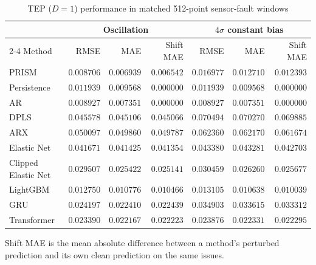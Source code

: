 \begin{table}[!t]
\centering
\caption{TEP ($D=1$) performance in matched 512-point sensor-fault windows}
\label{tab:fault-tep-d1}
\small
\begin{tabular}{lrrrrrr}
\hline
 & \multicolumn{3}{c}{Oscillation} & \multicolumn{3}{c}{$4\sigma$ constant bias} \\
\cline{2-4}\cline{5-7}
Method & RMSE & MAE & Shift MAE & RMSE & MAE & Shift MAE \\
\hline
PRISM & \(0.008706\) & \(0.006939\) & \(0.006542\) & \(0.016977\) & \(0.012710\) & \(0.012393\) \\
Persistence & \(0.011939\) & \(0.009568\) & \(0.000000\) & \(0.011939\) & \(0.009568\) & \(0.000000\) \\
AR & \(0.008927\) & \(0.007351\) & \(0.000000\) & \(0.008927\) & \(0.007351\) & \(0.000000\) \\
DPLS & \(0.045578\) & \(0.045106\) & \(0.045066\) & \(0.070494\) & \(0.070270\) & \(0.069885\) \\
ARX & \(0.050097\) & \(0.049860\) & \(0.049787\) & \(0.062360\) & \(0.062170\) & \(0.061674\) \\
Elastic Net & \(0.041671\) & \(0.041425\) & \(0.041354\) & \(0.043380\) & \(0.043281\) & \(0.042703\) \\
Clipped Elastic Net & \(0.029507\) & \(0.025422\) & \(0.025141\) & \(0.030459\) & \(0.026260\) & \(0.025677\) \\
LightGBM & \(0.012750\) & \(0.010776\) & \(0.010466\) & \(0.013105\) & \(0.010638\) & \(0.010039\) \\
GRU & \(0.024197\) & \(0.022410\) & \(0.022439\) & \(0.034903\) & \(0.033615\) & \(0.033312\) \\
Transformer & \(0.023390\) & \(0.022167\) & \(0.022223\) & \(0.023876\) & \(0.022331\) & \(0.022295\) \\
\hline
\end{tabular}
\par\smallskip
\parbox{0.96\textwidth}{\footnotesize Shift MAE is the mean absolute difference between a method's perturbed prediction and its own clean prediction on the same issues.}
\end{table}

